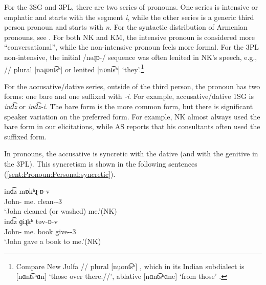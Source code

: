 For the 3SG and 3PL, there are two series of pronouns. One series is intensive \citep[126]{DumTragut-2009-ArmenianReferenceGrammar} or emphatic \citep{Donabedian-2018-WestArmTypoSocio} and starts with the segment \textit{{i}}, while the other series is a generic third person pronoun and starts with \textit{{n}}. For the syntactic distribution of Armenian pronouns, see \citet{sigler-2001-logophoricPronounWesternArmenian,donabedian-2007-rechercheLogophorWesternArmenian}. For both NK and KM, the intensive pronoun is considered more ``conversational'', while the non-intensive pronoun feels more formal.
For the 3PL non-intensive, the initial /{nəɻɒ-}/ sequence was often lenited in NK's speech, e.g., {\acc}/{\dat}/{\gen} plural [{nəɻɒnt͡sʰ}] or lenited [{nɒnt͡sʰ}] `they'.\footnote{Compare New Julfa  {\acc}/{\dat}/{\gen}   plural [nu̯ont͡sʰ] , which in its Indian subdialect is [nɑnt͡sʰɑn]  `those over there.{\acc}/{\dat}/{\gen}',  ablative [nɑnt͡sʰɑne]  ‘from those' \citep[\S 266]{Adjarian-1940-NewJulfaDialect}. }

For the accusative/dative series, outside of the third person, the pronoun has two forms: one bare and one suffixed with \textit{{-i}}. For example, accusative/dative 1SG is \textit{{ind͡z}} or \textit{{ind͡z-i}}. The bare form is the more common form, but there is significant speaker variation on the preferred form. For example, NK almost always used the bare form in our elicitations, while AS reports that his consultants often used the suffixed form.  

In pronouns, the accusative is syncretic with the dative (and with the genitive in the 3PL). This syncretism is shown in the following sentences (\ref{sent:Pronoun:Personal:syncretic}).

\begin{exe}
	\ex \label{sent:Pronoun:Personal:syncretic}
	\begin{xlist}
		
		\ex {} {ind͡z} {mɒkʰɻ-ɒ-v}
		\\
		John-{} me.{\dat} clean-{\pst}-3{\sg}
		\\
		\trans		`John cleaned (or washed) me.'\hfill (NK)
		\\
		\ex {} {ind͡z} ɡiɻkʰ  {təv-ɒ-v}
		\\
		John-{} me.{\dat} book give-{\pst}-3{\sg}
		\\
		\trans	`John gave a book to me.'\hfill (NK)
		\\
		
	\end{xlist}
	
\end{exe}

